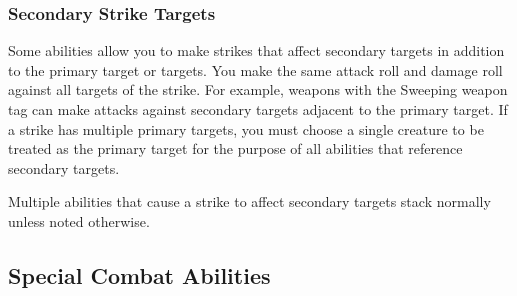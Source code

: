         \subsubsection{Secondary Strike Targets}\label{Secondary Strike Targets}
            Some abilities allow you to make strikes that affect secondary targets in addition to the primary target or targets.
            You make the same attack roll and damage roll against all targets of the strike.
            For example, weapons with the Sweeping weapon tag can make attacks against secondary targets adjacent to the primary target.
            If a strike has multiple primary targets, you must choose a single creature to be treated as the primary target for the purpose of all abilities that reference secondary targets.

            Multiple abilities that cause a strike to affect secondary targets stack normally unless noted otherwise.

    \subsection{Special Combat Abilities}\label{Special Combat Abilities}

